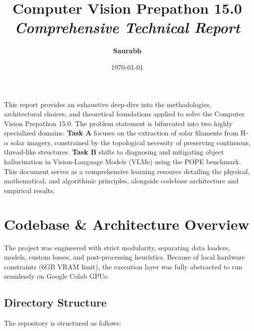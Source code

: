 \documentclass[12pt,a4paper]{article}
\title{
    \vspace{-2cm}
    \color{PrimaryBlue}\Huge\textbf{Computer Vision Prepathon 15.0} \\
    \vspace{0.5cm}
    \color{SecondaryTeal}\LARGE\textit{Comprehensive Technical Report}
}
\author{\textbf{Saurabh}}
\affil{InterIIT Tech Meet 15.0 Preparation}
\date{\today}
\begin{document}
\maketitle

\begin{tcolorbox}[colback=PrimaryBlue!5, colframe=PrimaryBlue, title=\textbf{Abstract}]
This report provides an exhaustive deep-dive into the methodologies, architectural choices, and theoretical foundations applied to solve the Computer Vision Prepathon 15.0. The problem statement is bifurcated into two highly specialized domains. \textbf{Task A} focuses on the extraction of solar filaments from H-$\alpha$ solar imagery, constrained by the topological necessity of preserving continuous, thread-like structures. \textbf{Task B} shifts to diagnosing and mitigating object hallucination in Vision-Language Models (VLMs) using the POPE benchmark. This document serves as a comprehensive learning resource detailing the physical, mathematical, and algorithmic principles, alongside codebase architecture and empirical results.
\end{tcolorbox}

\tableofcontents
\newpage

\section{Codebase \& Architecture Overview}
The project was engineered with strict modularity, separating data loaders, models, custom losses, and post-processing heuristics. Because of local hardware constraints (6GB VRAM limit), the execution layer was fully abstracted to run seamlessly on Google Colab GPUs.

\subsection{Directory Structure}
The repository is structured as follows:
\end{document}
